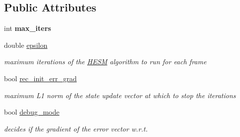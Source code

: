 \subsection*{Public Attributes}
\begin{DoxyCompactItemize}
\item 
\hypertarget{structHESMParams_aa653addbecae100fcf512b661bd09b37}{int {\bfseries max\-\_\-iters}}\label{structHESMParams_aa653addbecae100fcf512b661bd09b37}

\item 
\hypertarget{structHESMParams_af18ff4f71d9d4432b7c2089e5b646f35}{double \hyperlink{structHESMParams_af18ff4f71d9d4432b7c2089e5b646f35}{epsilon}}\label{structHESMParams_af18ff4f71d9d4432b7c2089e5b646f35}

\begin{DoxyCompactList}\small\item\em maximum iterations of the \hyperlink{classHESM}{H\-E\-S\-M} algorithm to run for each frame \end{DoxyCompactList}\item 
\hypertarget{structHESMParams_a31e31801829a257b843e260c3068caee}{bool \hyperlink{structHESMParams_a31e31801829a257b843e260c3068caee}{rec\-\_\-init\-\_\-err\-\_\-grad}}\label{structHESMParams_a31e31801829a257b843e260c3068caee}

\begin{DoxyCompactList}\small\item\em maximum L1 norm of the state update vector at which to stop the iterations \end{DoxyCompactList}\item 
bool \hyperlink{structHESMParams_ac8ef09af9c0a41d404ff03237ecb0b58}{debug\-\_\-mode}
\begin{DoxyCompactList}\small\item\em decides if the gradient of the error vector w.\-r.\-t. \end{DoxyCompactList}\end{DoxyCompactItemize}


